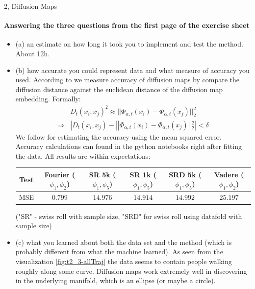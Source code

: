 \begin{task}{2, Diffusion Maps}
\paragraph{Answering the three questions from the first page of the exercise sheet}
\begin{itemize}
    \item (a) an estimate on how long it took you to implement and test the method. About 12h.
    \item (b) how accurate you could represent data and what measure of accuracy you used. According to \cite{berry2013} we measure accuracy of diffusion maps by compare the diffusion distance against the euclidean distance of the diffusion map embedding. Formally:
    \begin{align*}
        &D_t (x_i ,x_j ) ^2 \approx ||\Phi_{\alpha ,t}(x_i ) -\Phi_{\alpha ,t}(x_j )||_2^2\\
       \Rightarrow &|D_t (x_i ,x_j ) - ||\Phi_{\alpha ,t}(x_i ) -\Phi_{\alpha ,t}(x_j )||_2^2 | < \delta
    \end{align*}
    We follow \cite{roozemond2021} for estimating the accuracy using the mean squared error. Accuracy calculations can found in the python notebooks right after fitting the data. All results are within expectations:
    \begin{center}
    \begin{tabular}{ |c|c|c|c|c|c| }
    \hline
     Test & Fourier ($\phi_1 ,\phi_2$) & SR 5k ($\phi_1 ,\phi_5$) & SR 1k ($\phi_1 ,\phi_5$) & SRD 5k ($\phi_1 ,\phi_5$) & Vadere ($\phi_1 ,\phi_2$)\\
    \hline
     MSE & $0.799$ & $14.976$ & $14.914$ & $14.992$ & $25.197$\\ 
    \hline
    \end{tabular}

    ("SR" - swiss roll with sample size, "SRD" for swiss roll using datafold with sample size)
    \end{center}
    \item (c) what you learned about both the data set and the method (which is probably different from what the machine learned). As seen from the visualization \ref{fig:t2_3-allTraj} the data seems to contain people walking roughly along some curve. Diffusion maps work extremely well in discovering in the underlying manifold, which is an ellipse (or maybe a circle).
\end{itemize}

\end{task}